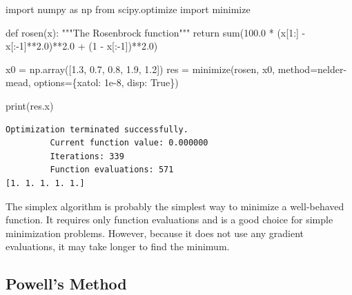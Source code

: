 \documentclass[
  letterpaper,
  DIV=11,
  numbers=noendperiod]{scrreprt}
\newenvironment{Shaded}{\begin{snugshade}}{\end{snugshade}}
\newcommand{\BuiltInTok}[1]{\textcolor[rgb]{0.00,0.23,0.31}{#1}}
\newcommand{\CommentTok}[1]{\textcolor[rgb]{0.37,0.37,0.37}{#1}}
\newcommand{\ControlFlowTok}[1]{\textcolor[rgb]{0.00,0.23,0.31}{#1}}
\newcommand{\DecValTok}[1]{\textcolor[rgb]{0.68,0.00,0.00}{#1}}
\newcommand{\FloatTok}[1]{\textcolor[rgb]{0.68,0.00,0.00}{#1}}
\newcommand{\ImportTok}[1]{\textcolor[rgb]{0.00,0.46,0.62}{#1}}
\newcommand{\KeywordTok}[1]{\textcolor[rgb]{0.00,0.23,0.31}{#1}}
\newcommand{\NormalTok}[1]{\textcolor[rgb]{0.00,0.23,0.31}{#1}}
\newcommand{\OperatorTok}[1]{\textcolor[rgb]{0.37,0.37,0.37}{#1}}
\newcommand{\StringTok}[1]{\textcolor[rgb]{0.13,0.47,0.30}{#1}}
\newcommand{\VariableTok}[1]{\textcolor[rgb]{0.07,0.07,0.07}{#1}}
\begin{document}
\begin{Shaded}
\begin{Highlighting}[]
\ImportTok{import}\NormalTok{ numpy }\ImportTok{as}\NormalTok{ np}
\ImportTok{from}\NormalTok{ scipy.optimize }\ImportTok{import}\NormalTok{ minimize}

\KeywordTok{def}\NormalTok{ rosen(x):}
    \CommentTok{"""The Rosenbrock function"""}
    \ControlFlowTok{return} \BuiltInTok{sum}\NormalTok{(}\FloatTok{100.0} \OperatorTok{*}\NormalTok{ (x[}\DecValTok{1}\NormalTok{:] }\OperatorTok{{-}}\NormalTok{ x[:}\OperatorTok{{-}}\DecValTok{1}\NormalTok{]}\OperatorTok{**}\FloatTok{2.0}\NormalTok{)}\OperatorTok{**}\FloatTok{2.0} \OperatorTok{+}\NormalTok{ (}\DecValTok{1} \OperatorTok{{-}}\NormalTok{ x[:}\OperatorTok{{-}}\DecValTok{1}\NormalTok{])}\OperatorTok{**}\FloatTok{2.0}\NormalTok{)}

\NormalTok{x0 }\OperatorTok{=}\NormalTok{ np.array([}\FloatTok{1.3}\NormalTok{, }\FloatTok{0.7}\NormalTok{, }\FloatTok{0.8}\NormalTok{, }\FloatTok{1.9}\NormalTok{, }\FloatTok{1.2}\NormalTok{])}
\NormalTok{res }\OperatorTok{=}\NormalTok{ minimize(rosen, x0, method}\OperatorTok{=}\StringTok{\textquotesingle{}nelder{-}mead\textquotesingle{}}\NormalTok{,}
\NormalTok{               options}\OperatorTok{=}\NormalTok{\{}\StringTok{\textquotesingle{}xatol\textquotesingle{}}\NormalTok{: }\FloatTok{1e{-}8}\NormalTok{, }\StringTok{\textquotesingle{}disp\textquotesingle{}}\NormalTok{: }\VariableTok{True}\NormalTok{\})}

\BuiltInTok{print}\NormalTok{(res.x)}
\end{Highlighting}
\end{Shaded}

\begin{verbatim}
Optimization terminated successfully.
         Current function value: 0.000000
         Iterations: 339
         Function evaluations: 571
[1. 1. 1. 1. 1.]
\end{verbatim}

The simplex algorithm is probably the simplest way to minimize a
well-behaved function. It requires only function evaluations and is a
good choice for simple minimization problems. However, because it does
not use any gradient evaluations, it may take longer to find the
minimum.

\hypertarget{sec-powells-method}{%
\subsection{Powell's Method}\label{sec-powells-method}}
\end{document}
